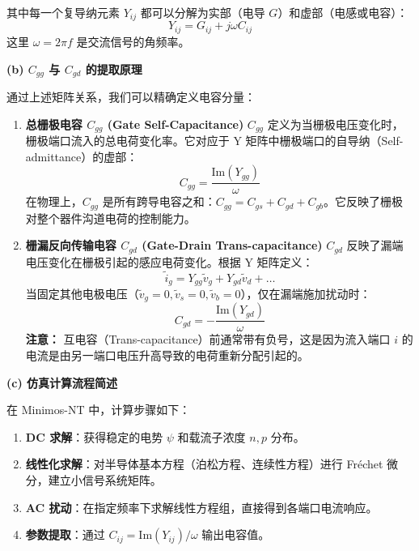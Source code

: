 \documentclass[12pt, a4paper, UTF8]{article}
\begin{document}
其中每一个复导纳元素 $Y_{ij}$ 都可以分解为实部（电导 $G$）和虚部（电感或电容）：
\begin{equation}
Y_{ij} = G_{ij} + j\omega C_{ij}
\end{equation}
这里 $\omega = 2\pi f$ 是交流信号的角频率。

\textbf{(b) $C_{gg}$ 与 $C_{gd}$ 的提取原理}

通过上述矩阵关系，我们可以精确定义电容分量：
\begin{enumerate}
\item \textbf{总栅极电容 $C_{gg}$ (Gate Self-Capacitance)}
$C_{gg}$ 定义为当栅极电压变化时，栅极端口流入的总电荷变化率。它对应于 Y 矩阵中栅极端口的自导纳（Self-admittance）的虚部：
\begin{equation}
C_{gg} = \frac{\text{Im}(Y_{gg})}{\omega}
\end{equation}
在物理上，$C_{gg}$ 是所有跨导电容之和：$C_{gg} = C_{gs} + C_{gd} + C_{gb}$。它反映了栅极对整个器件沟道电荷的控制能力。

\item \textbf{栅漏反向传输电容 $C_{gd}$ (Gate-Drain Trans-capacitance)}
$C_{gd}$ 反映了漏端电压变化在栅极引起的感应电荷变化。根据 Y 矩阵定义：
\begin{equation}
\tilde{i}_g = Y_{gg}\tilde{v}_g + Y_{gd}\tilde{v}_d + \dots
\end{equation}
当固定其他电极电压（$\tilde{v}_g=0, \tilde{v}_s=0, \tilde{v}_b=0$），仅在漏端施加扰动时：
\begin{equation}
C_{gd} = - \frac{\text{Im}(Y_{gd})}{\omega}
\end{equation}
\textbf{注意：} 互电容（Trans-capacitance）前通常带有负号，这是因为流入端口 $i$ 的电流是由另一端口电压升高导致的电荷重新分配引起的。

\end{enumerate}

\textbf{(c) 仿真计算流程简述}

在 Minimos-NT 中，计算步骤如下：
\begin{enumerate}
    \item \textbf{DC 求解}：获得稳定的电势 $\psi$ 和载流子浓度 $n, p$ 分布。
    \item \textbf{线性化求解}：对半导体基本方程（泊松方程、连续性方程）进行 Fréchet 微分，建立小信号系统矩阵。
    \item \textbf{AC 扰动}：在指定频率下求解线性方程组，直接得到各端口电流响应。
    \item \textbf{参数提取}：通过 $C_{ij} = \text{Im}(Y_{ij})/\omega$ 输出电容值。
\end{enumerate}
\end{document}
